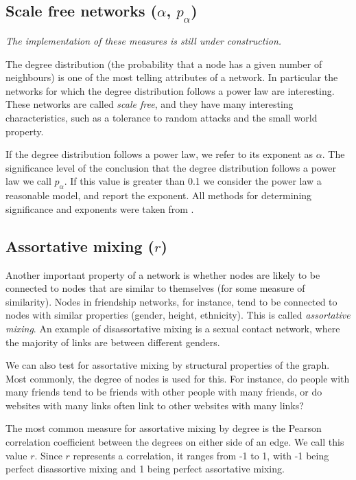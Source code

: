 \documentclass{article}
\theoremstyle{definition}
\begin{document}
\subsection*{Scale free networks ($\alpha$, $p_\alpha$)}

\textit{The implementation of these measures is still under construction.}

The degree distribution (the probability that a node has a given number of neighbours) is one of the most telling attributes of a network. In particular the networks for which the degree distribution follows a power law are interesting. These networks are called \emph{scale free}, and they have many  interesting characteristics, such as a tolerance to random attacks and the small world property. \cite{barabasi1999emergence}

If the degree distribution follows a power law, we refer to its exponent as $\alpha$.
The significance level of the conclusion that the degree distribution follows a power law we call $p_\alpha$. If this value is greater than 0.1 we consider the power law a reasonable model, and report the exponent. All methods for determining significance and exponents were taken from \cite{clauset2007power}.

\subsection*{Assortative mixing ($r$)}

Another important property of a network is whether nodes are likely to be connected to nodes that are similar to themselves (for some measure of similarity). Nodes in friendship networks, for instance, tend to be connected to nodes with similar properties (gender, height, ethnicity). This is called \emph{assortative mixing}. An example of disassortative mixing is a sexual contact network, where the majority of links are between different genders.

We can also test for assortative mixing by structural properties of the graph. Most commonly, the degree of nodes is used for this. For instance, do people with many friends tend to be friends with other people with many friends, or do websites with many links often link to other websites with many links?

The most common measure for assortative mixing by degree is the Pearson correlation coefficient between the degrees on either side of an edge. \cite{newman2002assortative} We call this value $r$. Since $r$ represents a correlation, it ranges from -1 to 1, with -1 being perfect disassortive mixing and 1 being perfect assortative mixing. 
\end{document}
